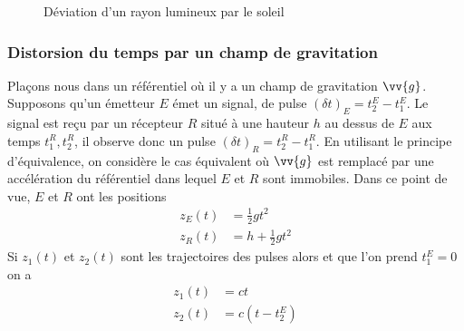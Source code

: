 \documentclass[a4paper,11pt]{report}
\theoremstyle{definition}
\theoremstyle{plain}
\theoremstyle{definition}
\theoremstyle{remark}
\newcommand{\x}{\times}
\begin{document}
                \begin{figure}[H]
                \centering
                \label{fig:my_label}
                \caption{Déviation d'un rayon lumineux par le soleil}
                \end{figure}
            
            \subsubsection{Distorsion du temps par un champ de gravitation}
            
                Plaçons nous dans un référentiel où il y a un champ de gravitation $\vv{g}$. Supposons qu'un émetteur $E$ émet un signal, de pulse $(\delta t)_E = t_2^E-t_1^E$. Le signal est reçu par un récepteur $R$ situé à une hauteur $h$ au dessus de $E$ aux temps $t_1^R,t_2^R$, il observe donc un pulse $(\delta t)_R = t_2^R-t_1^R$. En utilisant le principe d'équivalence, on considère le cas équivalent où $\vv{g}$ est remplacé par une accélération du référentiel dans lequel $E$ et $R$ sont immobiles. Dans ce point de vue, $E$ et $R$ ont les positions
                \begin{align}
                    z_E(t) &=  \frac{1}{2}gt^2 \\
                    z_R(t) &= h + \frac{1}{2}gt^2
                \end{align}
                Si $z_1(t)$ et $z_2(t)$ sont les trajectoires des pulses alors et que l'on prend $t_1^E = 0$ on a
                \begin{align}
                    z_1(t) &= ct \\
                    z_2(t) &= c(t-t_2^E)
                \end{align}
                
\end{document}
